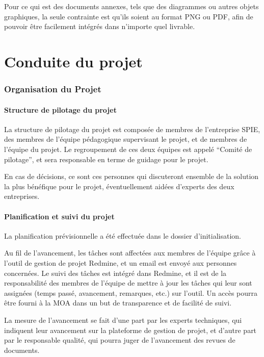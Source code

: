 Pour ce qui est des documents annexes, tels que des diagrammes ou autres objets graphiques, la seule contrainte est qu'ils soient au format PNG ou PDF, afin de pouvoir être facilement intégrés dans n'importe quel livrable.

\part{Conduite du projet}

\section{Organisation du Projet}

\subsection{Structure de pilotage du projet}

La structure de pilotage du projet est composée de membres de l'entreprise SPIE, des membres de l'équipe pédagogique supervisant le projet, et de membres de l'équipe du projet. Le regroupement de ces deux équipes est appelé ``Comité de pilotage'', et sera responsable en terme de guidage pour le projet.

En cas de décisions, ce sont ces personnes qui discuteront ensemble de la solution la plus bénéfique pour le projet, éventuellement aidées d'experts des deux entreprises.

\subsection{Planification et suivi du projet }

La planification prévisionnelle a été effectuée dans le dossier d'initialisation.

Au fil de l'avancement, les tâches sont affectées aux membres de l'équipe grâce à l'outil de gestion de projet Redmine, et un email est envoyé aux personnes concernées. Le suivi des tâches est intégré dans Redmine, et il est de la responsabilité des membres de l'équipe de mettre à jour les tâches qui leur sont assignées (temps passé, avancement, remarques, etc.) sur l'outil. Un accès pourra être fourni à la MOA dans un but de transparence et de facilité de suivi.

La mesure de l'avancement se fait d'une part par les experts techniques, qui indiquent leur avancement sur la plateforme de gestion de projet, et d'autre part par le responsable qualité, qui pourra juger de l'avancement des revues de documents.

